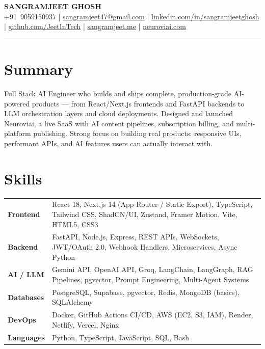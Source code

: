 \documentclass[9.5pt]{article}
\begin{document}
\begin{center}
  {\large \textbf{SANGRAMJEET GHOSH}} \\[2pt]
  {\small
    +91~9059150937 \;|\;
    \href{mailto:sangramjeet47@gmail.com}{sangramjeet47@gmail.com} \;|\;
    \href{https://www.linkedin.com/in/sangramjeetghosh}{linkedin.com/in/sangramjeetghosh} \;|\;
    \href{https://github.com/JeetInTech}{github.com/JeetInTech} \;|\;
    \href{https://sangramjeet.me}{sangramjeet.me} \;|\;
    \href{https://neuroviai.com}{neuroviai.com}
  }
\end{center}

\vspace{-2pt}
\noindent\rule{\textwidth}{0.4pt}
\vspace{-4pt}

\section*{Summary}
Full Stack AI Engineer who builds and ships complete, production-grade AI-powered products --- from React/Next.js frontends and FastAPI backends to LLM orchestration layers and cloud deployments. Designed and launched Neuroviai, a live SaaS with AI content pipelines, subscription billing, and multi-platform publishing. Strong focus on building real products: responsive UIs, performant APIs, and AI features users can actually interact with.

\section*{Skills}
\begin{tabularx}{\textwidth}{@{} p{2.0cm} X @{}}
\textbf{Frontend}   & React 18, Next.js 14 (App Router / Static Export), TypeScript, Tailwind CSS, ShadCN/UI, Zustand, Framer Motion, Vite, HTML5, CSS3 \\[1pt]
\textbf{Backend}    & FastAPI, Node.js, Express, REST APIs, WebSockets, JWT/OAuth 2.0, Webhook Handlers, Microservices, Async Python \\[1pt]
\textbf{AI / LLM}   & Gemini API, OpenAI API, Groq, LangChain, LangGraph, RAG Pipelines, pgvector, Prompt Engineering, Multi-Agent Systems \\[1pt]
\textbf{Databases}  & PostgreSQL, Supabase, pgvector, Redis, MongoDB (basics), SQLAlchemy \\[1pt]
\textbf{DevOps}     & Docker, GitHub Actions CI/CD, AWS (EC2, S3, IAM), Render, Netlify, Vercel, Nginx \\[1pt]
\textbf{Languages}  & Python, TypeScript, JavaScript, SQL, Bash \\
\end{tabularx}
\end{document}
